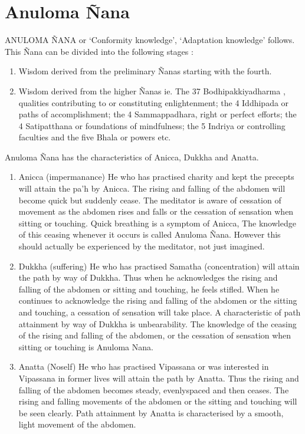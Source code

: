 \documentclass[a5paper,10pt,english]{book}
\begin{document}
\section{Anuloma Ñana}
\label{\detokenize{progress:anuloma-nana}}
\sphinxAtStartPar
ANULOMA ÑANA or ‘Conformity knowledge’, ‘Adaptation knowledge’ follows. This Ñana can be divided into the following stages :\sphinxhyphen{}
\begin{enumerate}
%
\item {} 
\sphinxAtStartPar
Wisdom derived from the preliminary Ñanas starting with the fourth.

\item {} 
\sphinxAtStartPar
Wisdom derived from the higher Ñanas ie. The 37 Bodhipakkiyadharma , qualities contributing to or constituting enlightenment; the 4 Iddhipada or paths of accomplishment; the 4 Sammappadhara, right or perfect efforts; the 4 Satipatthana or foundations of mindfulness; the 5 Indriya or controlling faculties and the five Bhala or powers etc.

\end{enumerate}

\sphinxAtStartPar
Anuloma Ñana has the characteristics of Anicca, Dukkha and Anatta.
\begin{enumerate}
%
\item {} 
\sphinxAtStartPar
Anicca (impermanance) He who has practised charity and kept the precepts will attain the pa’h by Anicca. The rising and falling of the abdomen will become quick but suddenly cease. The meditator is aware of cessation of movement as the abdomen rises and falls or the cessation of sensation when sitting or touching. Quick breathing is a symptom of Anicca, The knowledge of this ceasing whenever it occurs is called Anuloma Ñana. However this should actually be experienced by the meditator, not just imagined.

\item {} 
\sphinxAtStartPar
Dukkha (suffering) He who has practised Samatha (concentration) will attain the path by way of Dukkha. Thus when he acknowledges the rising and falling of the abdomen or sitting and touching, he feels stifled. When he continues to acknowledge the rising and falling of the abdomen or the sitting and touching, a cessation of sensation will take place. A characteristic of path attainment by way of Dukkha is unbearability. The knowledge of the ceasing of the rising and falling of the abdomen, or the cessation of sensation when sitting or touching is Anuloma Nana.

\item {} 
\sphinxAtStartPar
Anatta (No\sphinxhyphen{}self) He who has practised Vipassana or was interested in Vipassana in former lives will attain the path by Anatta. Thus the rising and falling of the abdomen becomes steady, evenly\sphinxhyphen{}spaced and then ceases. The rising and falling movements of the abdomen or the sitting and touching will be seen clearly. Path attainment by Anatta is characterised by a smooth, light movement of the abdomen.

\end{enumerate}
\end{document}
